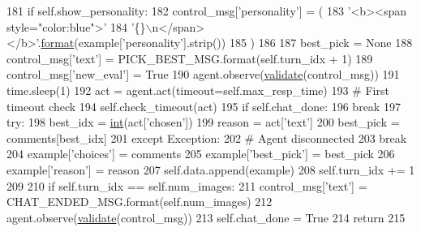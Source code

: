 \begin{DoxyCode}
181             \textcolor{keywordflow}{if} self.show\_personality:
182                 control\_msg[\textcolor{stringliteral}{'personality'}] = (
183                     \textcolor{stringliteral}{'<b><span style="color:blue">'}
184                     \textcolor{stringliteral}{'\{\}\(\backslash\)n</span></b>'}.\hyperlink{namespaceparlai_1_1chat__service_1_1services_1_1messenger_1_1shared__utils_a32e2e2022b824fbaf80c747160b52a76}{format}(example[\textcolor{stringliteral}{'personality'}].strip())
185                 )
186 
187             best\_pick = \textcolor{keywordtype}{None}
188             control\_msg[\textcolor{stringliteral}{'text'}] = PICK\_BEST\_MSG.format(self.turn\_idx + 1)
189             control\_msg[\textcolor{stringliteral}{'new\_eval'}] = \textcolor{keyword}{True}
190             agent.observe(\hyperlink{namespaceparlai_1_1core_1_1worlds_afc3fad603b7bce41dbdc9cdc04a9c794}{validate}(control\_msg))
191             time.sleep(1)
192             act = agent.act(timeout=self.max\_resp\_time)
193             \textcolor{comment}{# First timeout check}
194             self.check\_timeout(act)
195             \textcolor{keywordflow}{if} self.chat\_done:
196                 \textcolor{keywordflow}{break}
197             \textcolor{keywordflow}{try}:
198                 best\_idx = \hyperlink{namespacelanguage__model_1_1eval__ppl_a7d12ee00479673c5c8d1f6d01faa272a}{int}(act[\textcolor{stringliteral}{'chosen'}])
199                 reason = act[\textcolor{stringliteral}{'text'}]
200                 best\_pick = comments[best\_idx]
201             \textcolor{keywordflow}{except} Exception:
202                 \textcolor{comment}{# Agent disconnected}
203                 \textcolor{keywordflow}{break}
204             example[\textcolor{stringliteral}{'choices'}] = comments
205             example[\textcolor{stringliteral}{'best\_pick'}] = best\_pick
206             example[\textcolor{stringliteral}{'reason'}] = reason
207             self.data.append(example)
208             self.turn\_idx += 1
209 
210         \textcolor{keywordflow}{if} self.turn\_idx == self.num\_images:
211             control\_msg[\textcolor{stringliteral}{'text'}] = CHAT\_ENDED\_MSG.format(self.num\_images)
212             agent.observe(\hyperlink{namespaceparlai_1_1core_1_1worlds_afc3fad603b7bce41dbdc9cdc04a9c794}{validate}(control\_msg))
213         self.chat\_done = \textcolor{keyword}{True}
214         \textcolor{keywordflow}{return}
215 
\end{DoxyCode}
\mbox{\label{classstack__rank__evals_1_1worlds_1_1MTurkPersonalityCaptionsStackRankWorld_a2dd08f9107fee17e2833a529681d76db}} 
